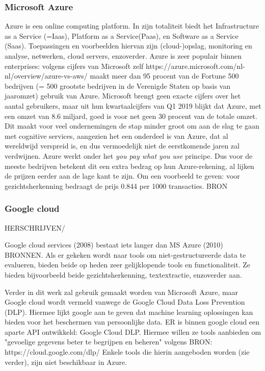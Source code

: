 \subsubsection{Microsoft Azure}
Azure is een online computing platform. In zijn totaliteit biedt het Infrastructure as a Service (=Iaas), Platform as a Service(Paas), en Software as a Service (Saas). Toepassingen en voorbeelden hiervan zijn (cloud-)opslag, monitoring en analyse, netwerken, cloud servers, enzoverder. 
Azure is zeer populair binnen enterprises: volgens cijfers van Microsoft zelf  https://azure.microsoft.com/nl-nl/overview/azure-vs-aws/ maakt meer dan 95 procent van de Fortune 500 bedrijven (= 500 grootste bedrijven in de Verenigde Staten op basis van jaaromzet) gebruik van Azure. Microsoft brengt geen exacte cijfers over het aantal gebruikers, maar uit hun kwartaalcijfers van Q1 2019 
blijkt dat Azure, met een omzet van 8.6 miljard, goed is voor net geen 30 procent van de totale omzet. 
Dit maakt voor veel ondernemingen de stap minder groot om aan de slag te gaan met cognitive services, aangezien het een onderdeel is van Azure, dat al wereldwijd verspreid is, en dus vermoedelijk niet de eerstkomende jaren zal verdwijnen. Azure werkt onder het \textit{you pay what you use} principe. Dus voor de meeste bedrijven betekent dit een extra bedrag op hun Azure-rekening, al lijken de prijzen eerder aan de lage kant te zijn. 
Om een voorbeeld te geven: voor gezichtsherkenning bedraagt de prijs \EUR{}0.844 per 1000 transacties. 
BRON 

\subsubsection{Google cloud}
HERSCHRIJVEN/ %

Google cloud services (2008) bestaat iets langer dan MS Azure (2010) BRONNEN. 
Als er gekeken wordt naar tools om niet-gestructureerde data te evalueren, bieden beide op heden zeer gelijklopende tools en functionaliteit. Ze bieden bijvoorbeeld beide gezichtsherkenning, textextractie, enzoverder aan.  

Verder in dit werk zal gebruik gemaakt worden van Microsoft Azure, maar Google cloud wordt vermeld vanwege de Google Cloud Data Loss Prevention (DLP). Hiermee lijkt google aan te geven dat machine learning oplossingen kan bieden voor het beschermen van persoonlijke data. 
ER is binnen google cloud een aparte API ontwikkeld: Google Cloud DLP. Hiermee willen ze tools aanbieden om "gevoelige gegevens beter te begrijpen en beheren" volgens  BRON: https://cloud.google.com/dlp/
Enkele tools die hierin aangeboden worden (zie verder), zijn niet beschikbaar in Azure. 

